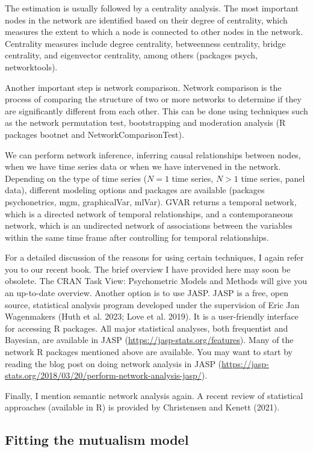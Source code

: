 \documentclass[
  a4paper,
  DIV=11,
  numbers=noendperiod,
  oneside]{scrreprt}
\begin{document}
The estimation is usually followed by a centrality analysis. The most
important nodes in the network are identified based on their degree of
centrality, which measures the extent to which a node is connected to
other nodes in the network. Centrality measures include degree
centrality, betweenness centrality, bridge centrality, and eigenvector
centrality, among others (packages psych, networktools).

Another important step is network comparison. Network comparison is the
process of comparing the structure of two or more networks to determine
if they are significantly different from each other. This can be done
using techniques such as the network permutation test, bootstrapping and
moderation analysis (R packages bootnet and NetworkComparisonTest).

We can perform network inference, inferring causal relationships between
nodes, when we have time series data or when we have intervened in the
network. Depending on the type of time series (\(N=1\) time series,
\(N>1\) time series, panel data), different modeling options and
packages are available (packages psychonetrics, mgm, graphicalVar,
mlVar). GVAR returns a temporal network, which is a directed network of
temporal relationships, and a contemporaneous network, which is an
undirected network of associations between the variables within the same
time frame after controlling for temporal relationships.

For a detailed discussion of the reasons for using certain techniques, I
again refer you to our recent book. The brief overview I have provided
here may soon be obsolete. The CRAN Task View: Psychometric Models and
Methods will give you an up-to-date overview. Another option is to use
JASP. JASP is a free, open source, statistical analysis program
developed under the supervision of Eric Jan Wagenmakers (Huth et al.
2023; Love et al. 2019). It is a user-friendly interface for accessing R
packages. All major statistical analyses, both frequentist and Bayesian,
are available in JASP (\url{https://jasp-stats.org/features}). Many of
the network R packages mentioned above are available. You may want to
start by reading the blog post on doing network analysis in JASP
(\url{https://jasp-stats.org/2018/03/20/perform-network-analysis-jasp/}).

Finally, I mention semantic network analysis again. A recent review of
statistical approaches (available in R) is provided by Christensen and
Kenett (2021).

\hypertarget{sec-Fitting-the-mutualism-model}{%
\subsection{Fitting the mutualism
model}\label{sec-Fitting-the-mutualism-model}}
\end{document}
